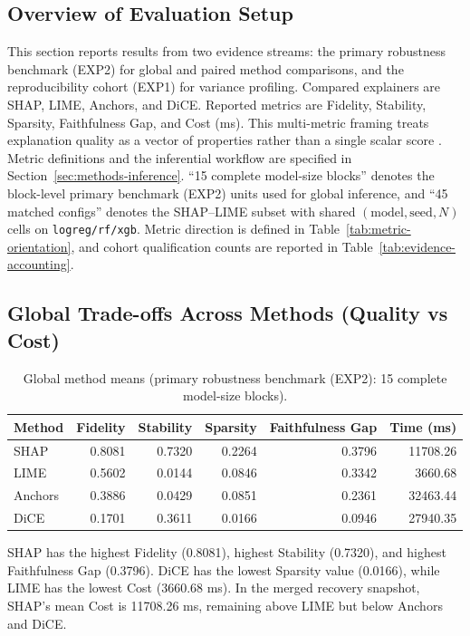 \documentclass[twoside,11pt]{article}
\begin{document}
\subsection{Overview of Evaluation Setup}
This section reports results from two evidence streams: the primary robustness
benchmark (EXP2) for global and paired method comparisons, and the
reproducibility cohort (EXP1) for variance profiling.
Compared explainers are SHAP, LIME, Anchors, and DiCE. Reported metrics are
Fidelity, Stability, Sparsity, Faithfulness Gap, and Cost (ms).
This multi-metric framing treats explanation quality as a vector of properties
rather than a single scalar score
\citep{kadir2023metrics,pawlicki2024multiple,arrieta2020xai}.
Metric definitions and the inferential workflow are specified in
Section~\ref{sec:methods-inference}.
``15 complete model-size blocks'' denotes the block-level primary benchmark
(EXP2) units used for
global inference, and ``45 matched configs'' denotes the SHAP--LIME subset with
shared $(\text{model},\text{seed},N)$ cells on \texttt{logreg/rf/xgb}.
Metric direction is defined in Table~\ref{tab:metric-orientation}, and cohort
qualification counts are reported in Table~\ref{tab:evidence-accounting}.

\subsection{Global Trade-offs Across Methods (Quality vs Cost)}
\begin{table}[h]
\centering
\caption{Global method means (primary robustness benchmark (EXP2): 15 complete model-size blocks).}
\begin{tabular}{lrrrrr}
\toprule
Method & Fidelity & Stability & Sparsity & Faithfulness Gap & Time (ms) \\
\midrule
SHAP    & 0.8081 & 0.7320 & 0.2264 & 0.3796 & 11708.26 \\
LIME    & 0.5602 & 0.0144 & 0.0846 & 0.3342 & 3660.68 \\
Anchors & 0.3886 & 0.0429 & 0.0851 & 0.2361 & 32463.44 \\
DiCE    & 0.1701 & 0.3611 & 0.0166 & 0.0946 & 27940.35 \\
\bottomrule
\end{tabular}
\label{tab:global-tradeoffs}
\end{table}

SHAP has the highest Fidelity (0.8081), highest Stability (0.7320), and highest
Faithfulness Gap (0.3796). DiCE has the lowest Sparsity value (0.0166), while
LIME has the lowest Cost (3660.68 ms). In the merged recovery snapshot, SHAP's
mean Cost is 11708.26 ms, remaining above LIME but below Anchors and
DiCE.
\end{document}
